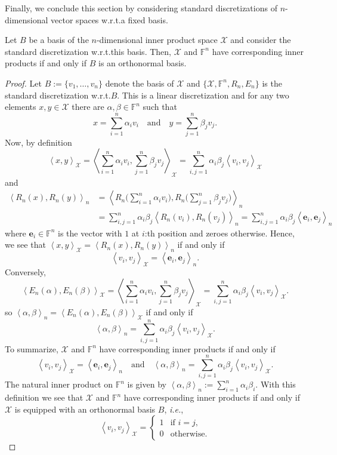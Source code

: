 \documentclass[a4paper]{paper}
\newcommand{\VecSpace}[1]{\mathscr{#1}}
\newcommand{\Field}{\mathbb{F}}
\newcommand{\ip}[2]{\left \langle #1,#2 \right\rangle}
\newcommand{\ie}{\textsl{i.e.}\xspace}
\newcommand{\ve}{\boldsymbol{e}}
\begin{document}
Finally, we conclude this section by considering standard discretizations of $n$-dimensional vector spaces
w.r.t.\@ a fixed basis. 
\begin{theorem}
  Let $B$ be a basis of the $n$-dimensional inner product space $\VecSpace{X}$ and 
  consider the standard discretization w.r.t.\@ this basis. 
   Then, $\VecSpace{X}$ and $\Field^{n}$ have corresponding inner products if and only if $B$ is an 
   orthonormal basis.
\end{theorem}
\begin{proof}
Let $B := \{ v_1, \ldots, v_n \}$ denote the basis of $\VecSpace{X}$ and $\{ \VecSpace{X},\Field^{n},R_{n},E_{n}\}$ 
is the standard discretization w.r.t.\@ $B$. This is a linear discretization and for any two elements 
$x,y \in \VecSpace{X}$ there are $\alpha,\beta\in\Field^{n}$ such that 
\[  x = \sum_{i=1}^n \alpha_i v_i \quad\text{and}\quad y = \sum_{j=1}^n \beta_j v_j. \]
Now, by definition
\[ 
   \ip{x}{y}_{\VecSpace{X}} = \ip{\sum_{i=1}^n \alpha_i v_i }{\sum_{j=1}^n \beta_j v_j}_{\VecSpace{X}} 
    =    \sum_{i,j=1}^n \alpha_i\beta_j \ip{v_i}{v_j}_{\VecSpace{X}}
\]
and
\begin{align*}
   \ip{R_{n}(x)}{R_{n}(y)}_{n} &=
       \ip{R_{n}\biggl( \sum_{i=1}^n \alpha_i v_i  \biggr) }
           {R_{n} \biggl( \sum_{j=1}^n \beta_j v_j  \biggr)}_{n} \\
  &= \sum_{i,j=1}^n \alpha_i \beta_j \ip{R_{n}(v_i)}{R_{n}(v_j)}_{n} =
        \sum_{i,j=1}^n \alpha_i \beta_j \ip{\ve_i}{\ve_j}_{n}
\end{align*}
where $\ve_i\in\Field^{n}$ is the vector with $1$ at $i$:th position and zeroes otherwise. 
Hence, we see that $\ip{x}{y}_{\VecSpace{X}} =  \ip{R_{n}(x)}{R_{n}(y)}_{n}$ if and only if 
\[ \ip{v_i}{v_j}_{\VecSpace{X}}=\ip{\ve_i}{\ve_j}_{n}. \]
Conversely,
\[ \ip{E_{n}(\alpha)}{E_{n}(\beta)}_{\VecSpace{X}} =
       \ip{  \sum_{i=1}^n \alpha_i v_i }{ \sum_{j=1}^n \beta_j v_j }_{\VecSpace{X}} 
   = \sum_{i,j=1}^n \alpha_i \beta_j \ip{v_i}{v_j}_{\VecSpace{X}}.
\]
so $ \ip{\alpha}{\beta}_{n} = \ip{E_{n}(\alpha)}{E_{n}(\beta)}_{\VecSpace{X}}$ if and only if 
\[  \ip{\alpha}{\beta}_{n} =  \sum_{i,j=1}^n \alpha_i \beta_j \ip{v_i}{v_j}_{\VecSpace{X}}. \]
To summarize, $\VecSpace{X}$ and $\Field^{n}$ have corresponding inner products if and only if 
\[  \ip{v_i}{v_j}_{\VecSpace{X}}= \ip{\ve_i}{\ve_j}_{n}
    \quad\text{and}\quad
    \ip{\alpha}{\beta}_{n} = \sum_{i,j=1}^n \alpha_i \beta_j \ip{v_i}{v_j}_{\VecSpace{X}}. \]
The natural inner product on $\Field^{n}$ is given by 
$\ip{\alpha}{\beta}_{n} :=\sum_{i=1}^n\alpha_i \beta_i$. With this definition we see that 
$\VecSpace{X}$ and $\Field^{n}$ have corresponding inner products if and only if $\VecSpace{X}$ is equipped with an 
orthonormal basis $B$, \ie, 
\[ \ip{v_i}{v_j}_{\VecSpace{X}} = \begin{cases} 1 & \text{if $i=j$,} \\ 0 & \text{otherwise.} \end{cases} \]
\end{proof}
\end{document}
